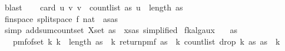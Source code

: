 \begin{isabellebody}
\ blast\isanewline
\isanewline
\ \ \isamarkupfalse%
\ {\isachardoublequoteopen}card\ {\isacharbraceleft}{\kern0pt}{\isacharparenleft}{\kern0pt}u{\isacharcomma}{\kern0pt}\ v{\isacharparenright}{\kern0pt}{\isachardot}{\kern0pt}\ v\ {\isacharless}{\kern0pt}\ count{\isacharunderscore}{\kern0pt}list\ as\ u{\isacharbraceright}{\kern0pt}\ {\isacharequal}{\kern0pt}\ length\ as{\isachardoublequoteclose}\isanewline
\ \ \ \ \isamarkupfalse%
\ fin{\isacharunderscore}{\kern0pt}space\ split{\isacharunderscore}{\kern0pt}space{\isacharbrackleft}{\kern0pt}\ f{\isacharequal}{\kern0pt}{\isachardoublequoteopen}{\isasymlambda}{\isacharunderscore}{\kern0pt}{\isachardot}{\kern0pt}\ {\isacharparenleft}{\kern0pt}{}{\isacharcolon}{\kern0pt}{\isacharcolon}{\kern0pt}nat{\isacharparenright}{\kern0pt}{\isachardoublequoteclose}{\isacharcomma}{\kern0pt}\ \ as{\isacharequal}{\kern0pt}{\isachardoublequoteopen}as{\isachardoublequoteclose}{\isacharbrackright}{\kern0pt}\isanewline
\ \ \ \ \isamarkupfalse%
\ {\isacharparenleft}{\kern0pt}simp\ add{\isacharcolon}{\kern0pt}sum{\isacharunderscore}{\kern0pt}count{\isacharunderscore}{\kern0pt}set{\isacharbrackleft}{\kern0pt}\ X{\isacharequal}{\kern0pt}{\isachardoublequoteopen}set\ as{\isachardoublequoteclose}\ \ xs{\isacharequal}{\kern0pt}{\isachardoublequoteopen}as{\isachardoublequoteclose}{\isacharcomma}{\kern0pt}\ simplified{\isacharbrackright}{\kern0pt}{\isacharparenright}{\kern0pt}\isanewline
{}\isamarkupfalse%
%
\endisatagproof
{\isafoldproof}%
%
\isadelimproof
\isanewline
%
\endisadelimproof
\isanewline
{}\isamarkupfalse%
\ fk{\isacharunderscore}{\kern0pt}alg{\isacharunderscore}{\kern0pt}aux{\isacharunderscore}{\kern0pt}{}{\isacharcolon}{\kern0pt}\isanewline
\ \ \ {\isachardoublequoteopen}as\ {\isasymnoteq}\ {\isacharbrackleft}{\kern0pt}{\isacharbrackright}{\kern0pt}{\isachardoublequoteclose}\isanewline
\ \ \ {\isachardoublequoteopen}pmf{\isacharunderscore}{\kern0pt}of{\isacharunderscore}{\kern0pt}set\ {\isacharbraceleft}{\kern0pt}k{\isachardot}{\kern0pt}\ k\ {\isacharless}{\kern0pt}\ length\ as{\isacharbraceright}{\kern0pt}\ {\isasymbind}\ {\isacharparenleft}{\kern0pt}{\isasymlambda}k{\isachardot}{\kern0pt}\ return{\isacharunderscore}{\kern0pt}pmf\ {\isacharparenleft}{\kern0pt}as\ {\isacharbang}{\kern0pt}\ k{\isacharcomma}{\kern0pt}\ count{\isacharunderscore}{\kern0pt}list\ {\isacharparenleft}{\kern0pt}drop\ {\isacharparenleft}{\kern0pt}k{\isacharplus}{\kern0pt}{}{\isacharparenright}{\kern0pt}\ as{\isacharparenright}{\kern0pt}\ {\isacharparenleft}{\kern0pt}as\ {\isacharbang}{\kern0pt}\ k{\isacharparenright}{\kern0pt}{\isacharparenright}{\kern0pt}{\isacharparenright}{\kern0pt}\isanewline

\end{isabellebody}
